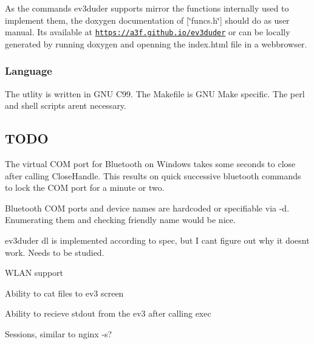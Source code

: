 As the commands ev3duder supports mirror the functions internally used to implement them, the doxygen documentation of \mbox{[}\char`\"{}funcs.\+h\char`\"{}\mbox{]} should do as user manual. It\textquotesingle{}s available at \href{https://a3f.github.io/ev3duder}{\tt https\+://a3f.\+github.\+io/ev3duder} or can be locally generated by running {\ttfamily doxygen} and openning the index.\+html file in a webbrowser.

\subsubsection*{Language}

The utlity is written in G\+N\+U C99. The Makefile is G\+N\+U Make specific. The perl and shell scripts aren\textquotesingle{}t necessary.

\subsection*{T\+O\+D\+O}


\begin{DoxyItemize}
\item The virtual C\+O\+M port for Bluetooth on Windows takes some seconds to close after calling {\ttfamily Close\+Handle}. This results on quick successive bluetooth commands to lock the C\+O\+M port for a minute or two.
\item Bluetooth C\+O\+M ports and device names are hardcoded or specifiable via -\/d. Enumerating them and checking friendly name would be nice.
\item {\ttfamily ev3duder dl} is implemented according to spec, but I can\textquotesingle{}t figure out why it doesn\textquotesingle{}t work. Needs to be studied.
\item W\+L\+A\+N support
\item Ability to cat files to ev3 screen
\item Ability to recieve stdout from the ev3 after calling exec
\item Sessions, similar to {\ttfamily nginx -\/s}? 
\end{DoxyItemize}